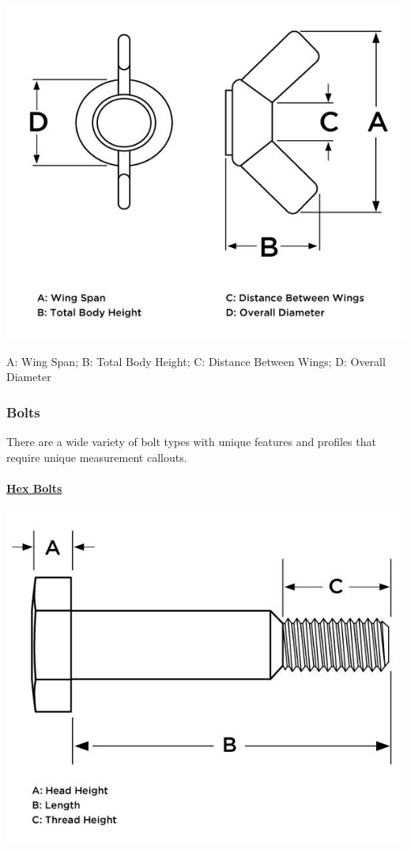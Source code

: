 \documentclass[english,]{article}
\let\oldparagraph\paragraph
\renewcommand{\paragraph}[1]{\oldparagraph{#1}\mbox{}}
\begin{document}
\includegraphics{Introduction to Nut and Bolt Sizes_files/6307bc42ebae7262807955.jpg}

\hypertarget{ira03ji}{}
A: Wing Span; B: Total Body Height; C: Distance Between Wings; D:
Overall Diameter

\hypertarget{iruib3g}{%
\subsubsection{Bolts}\label{iruib3g}}

\hypertarget{i921nmg}{}
There are a wide variety of bolt types with unique features and profiles
that require unique measurement callouts.

\hypertarget{i45vs4o}{}
\hypertarget{iygv1bu}{}
\hypertarget{ikau5po}{%
\paragraph{\texorpdfstring{\href{https://www.huyett.com/all-products/bolts/hex-bolts}{Hex
Bolts}}{Hex Bolts}}\label{ikau5po}}

\includegraphics{Introduction to Nut and Bolt Sizes_files/6307bd0a95270402904591.jpg}
\end{document}
